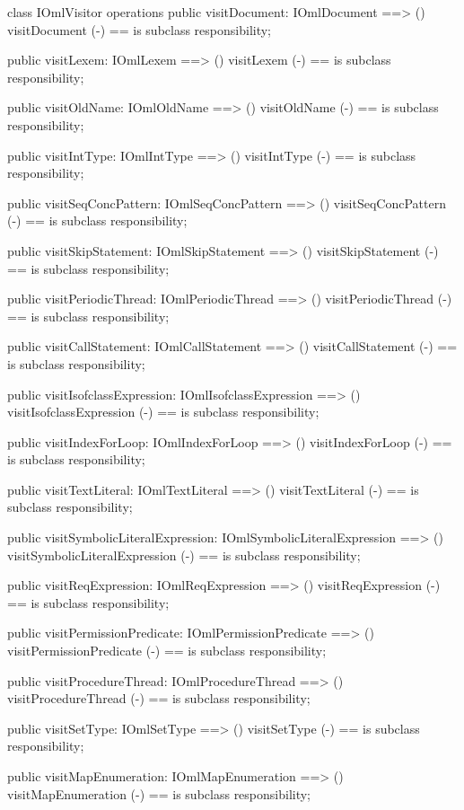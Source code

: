\begin{vdm_al}
class IOmlVisitor
operations
  public visitDocument: IOmlDocument ==> ()
  visitDocument (-) == is subclass responsibility;

  public visitLexem: IOmlLexem ==> ()
  visitLexem (-) == is subclass responsibility;

  public visitOldName: IOmlOldName ==> ()
  visitOldName (-) == is subclass responsibility;

  public visitIntType: IOmlIntType ==> ()
  visitIntType (-) == is subclass responsibility;

  public visitSeqConcPattern: IOmlSeqConcPattern ==> ()
  visitSeqConcPattern (-) == is subclass responsibility;

  public visitSkipStatement: IOmlSkipStatement ==> ()
  visitSkipStatement (-) == is subclass responsibility;

  public visitPeriodicThread: IOmlPeriodicThread ==> ()
  visitPeriodicThread (-) == is subclass responsibility;

  public visitCallStatement: IOmlCallStatement ==> ()
  visitCallStatement (-) == is subclass responsibility;

  public visitIsofclassExpression: IOmlIsofclassExpression ==> ()
  visitIsofclassExpression (-) == is subclass responsibility;

  public visitIndexForLoop: IOmlIndexForLoop ==> ()
  visitIndexForLoop (-) == is subclass responsibility;

  public visitTextLiteral: IOmlTextLiteral ==> ()
  visitTextLiteral (-) == is subclass responsibility;

  public visitSymbolicLiteralExpression: IOmlSymbolicLiteralExpression ==> ()
  visitSymbolicLiteralExpression (-) == is subclass responsibility;

  public visitReqExpression: IOmlReqExpression ==> ()
  visitReqExpression (-) == is subclass responsibility;

  public visitPermissionPredicate: IOmlPermissionPredicate ==> ()
  visitPermissionPredicate (-) == is subclass responsibility;

  public visitProcedureThread: IOmlProcedureThread ==> ()
  visitProcedureThread (-) == is subclass responsibility;

  public visitSetType: IOmlSetType ==> ()
  visitSetType (-) == is subclass responsibility;

  public visitMapEnumeration: IOmlMapEnumeration ==> ()
  visitMapEnumeration (-) == is subclass responsibility;


\end{vdm_al}
